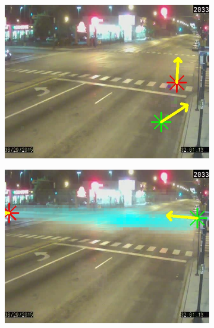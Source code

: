 \begin{figure}
        \begin{subfigure}{0.32\linewidth}
            \includegraphics[width=\linewidth]{./img/scene_learning/res/ciceroPeterson/20150829_020000DST_ciceroPeterson-3.jpg}
        \end{subfigure}
        \begin{subfigure}{0.32\linewidth}
            \includegraphics[width=\linewidth]{./img/scene_learning/res/ciceroPeterson/20150829_020000DST_ciceroPeterson-4.jpg}
        \end{subfigure}
        \begin{subfigure}{0.32\linewidth}

\end{subfigure}
\end{figure}
